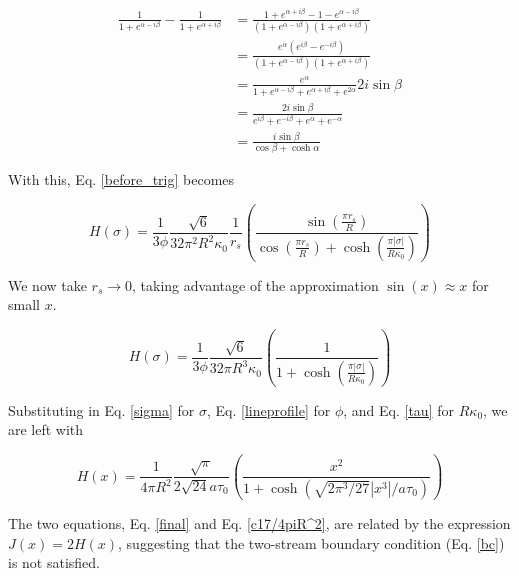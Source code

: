 \documentclass[onecolumn]{aastex63}
\begin{document}
\begin{equation}
    \begin{split}
    \frac{1}{1+e^{\alpha - i\beta}} - \frac{1}{1+e^{\alpha + i\beta}} &= \frac{1+e^{\alpha + i\beta} - 1 - e^{\alpha - i\beta}}{\left(1+e^{\alpha - i\beta}\right)\left(1+e^{\alpha + i\beta}\right)} \\
    &= \frac{e^{\alpha}\left(e^{i\beta} - e^{- i\beta}\right)}{\left(1+e^{\alpha - i\beta}\right)\left(1+e^{\alpha + i\beta}\right)} \\
    &= \frac{e^{\alpha}}{1 + e^{\alpha - i\beta} + e^{\alpha + i\beta} + e^{2\alpha}} 2i \sin{\beta} \\
    &= \frac{2i \sin{\beta}}{e^{i\beta} + e^{- i\beta} + e^{\alpha} + e^{-\alpha}} \\
    &= \frac{i \sin{\beta}}{\cos{\beta} + \cosh{\alpha}}
    \end{split}
\end{equation}

With this, Eq. \ref{before_trig} becomes

\begin{equation} \label{after_trig}
    H(\sigma) = \frac{1}{3 \phi} \frac{\sqrt{6}}{32 \pi^2 R^2 \kappa_0} \frac{1}{r_s} \left(\frac{\sin{\left(\frac{\pi r_s}{R}\right)}}{\cos{\left(\frac{\pi r_s}{R}\right)} + \cosh{\left(\frac{\pi |\sigma|}{R\kappa_0}\right)}}\right)
\end{equation}

We now take $r_s \rightarrow 0$, taking advantage of the approximation $\sin(x) \approx x$ for small $x$.

\begin{equation}
    H(\sigma) = \frac{1}{3 \phi} \frac{\sqrt{6}}{32 \pi R^3 \kappa_0} \left(\frac{1}{1 + \cosh{\left(\frac{\pi |\sigma|}{R\kappa_0}\right)}}\right)
\end{equation}

Substituting in Eq. \ref{sigma} for $\sigma$, Eq. \ref{lineprofile} for $\phi$, and Eq. \ref{tau} for $R \kappa_0$, we are left with

\begin{equation} \label{final}
    H(x) = \frac{1}{4\pi R^2}\frac{\sqrt{\pi}}{2\sqrt{24}a\tau_0} \left(\frac{x^2}{1 + \cosh{\left(\sqrt{2\pi^3/27}|x^3|/a\tau_0\right)}}\right)
\end{equation}

The two equations, Eq. \ref{final} and Eq. \ref{c17/4piR^2}, are related by the expression $J(x) = 2 H(x)$, suggesting that the two-stream boundary condition (Eq. \ref{bc}) is not satisfied.

{}

\end{document}
